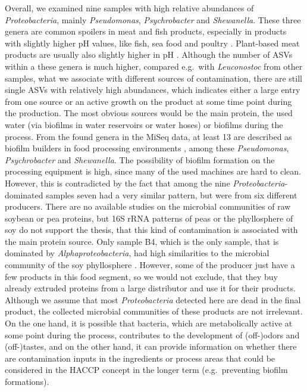 \documentclass[preprint, 3p,
authoryear]{elsarticle} %
\begin{document}
Overall, we examined nine samples with high relative abundances of
\emph{Proteobacteria}, mainly \emph{Pseudomonas}, \emph{Psychrobacter}
and \emph{Shewanella}. These three genera are common spoilers in meat
and fish products, especially in products with slightly higher pH
values, like fish, sea food and poultry
\citep[\citet{Odeyemi.2018}]{Borch.1996}. Plant-based meat products are
usually also slightly higher in pH
\citep[\citet{Toth.2021}]{Geeraerts.2020}. Although the number of ASVs
within a these genera is much higher, compared e.g.~with
\emph{Leuconostoc} from other samples, what we associate with different
sources of contamination, there are still single ASVs with relatively
high abundances, which indicates either a large entry from one source or
an active growth on the product at some time point during the
production. The most obvious sources would be the main protein, the used
water (via biofilms in water reservoirs or water hoses) or biofilms
during the process. From the found genera in the MiSeq data, at least 13
are described as biofilm builders in food processing environments
\citep{Wagner.2021}, among these \emph{Pseudomonas},
\emph{Psychrobacter} and \emph{Shewanella}. The possibility of biofilm
formation on the processing equipment is high, since many of the used
machines are hard to clean. However, this is contradicted by the fact
that among the nine \emph{Proteobacteria}-dominated samples seven had a
very similar pattern, but were from six different producers. There are
no available studies on the microbial communities of raw soybean or pea
proteins, but 16S rRNA patterns of peas or the phyllosphere of soy do
not support the thesis, that this kind of contamination is associated
with the main protein source. Only sample B4, which is the only sample,
that is dominated by \emph{Alphaproteobacteria}, had high similarities
to the microbial community of the soy phyllosphere \citep{Vorholt.2012}.
However, some of the producer just have a few products in this food
segment, so we would not exclude, that they buy already extruded
proteins from a large distributor and use it for their products.
Although we assume that most \emph{Proteobacteria} detected here are
dead in the final product, the collected microbial communities of these
products are not irrelevant. On the one hand, it is possible that
bacteria, which are metabolically active at some point during the
process, contributes to the development of (off-)odors and (off-)tastes,
and on the other hand, it can provide information on whether there are
contamination inputs in the ingredients or process areas that could be
considered in the HACCP concept in the longer term (e.g.~preventing
biofilm formations).
\end{document}
